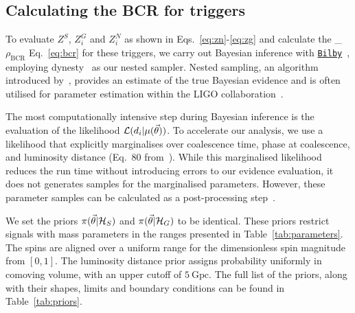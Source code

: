 \documentclass[%
 nofootinbib,
 amsmath,amssymb,
 aps,
 twocolumn
]{revtex4-2}
\newcommand{\bilby}{{\sc \href{https://lscsoft.docs.ligo.org/bilby/}{\texttt{Bilby}}}\xspace}
\newcommand{\dynesty}{{\sc dynesty}\xspace}
\newcommand{\mathcmd}[1]{{\sc \relax\ifmmode#1\else $#1$\fi}\xspace}
\newcommand{\bcr}{\mathcmd{\rho_\text{BCR}}}
\newcommand{\parameters}{\mathcmd{\vec{\theta}}}
\newcommand{\template}{\mathcmd{\mu(\parameters)}}
\begin{document}
\subsection{Calculating the BCR for triggers}
To evaluate $Z^S$, $Z^G_i$ and $Z^N_i$ as shown in Eqs.~\ref{eq:zn}-\ref{eq:zg} and calculate the \bcr Eq.~\ref{eq:bcr} for these triggers, we carry out Bayesian inference with \bilby~\cite{bilby}, employing \dynesty~\cite{dynesty} as our nested sampler. Nested sampling, an algorithm introduced by~\citet{skilling2004, skilling2006}, provides an estimate of the true Bayesian evidence and is often utilised for parameter estimation within the LIGO collaboration~\cite{bilby, bilby_paper, pbilby_paper}.

The most computationally intensive step during Bayesian inference is the evaluation of the likelihood $\mathcal{L}(d_i|\template)$. To accelerate our analysis, we use a likelihood that explicitly marginalises over coalescence time, phase at coalescence, and luminosity distance (Eq.~80 from~\citet{intro_to_gw_bayes}). While this marginalised likelihood reduces the run time without introducing errors to our evidence evaluation, it does not generates samples for the marginalised parameters. However, these parameter samples can be calculated as a post-processing step~\cite{intro_to_gw_bayes}.

We set the priors $\pi(\parameters|\mathcal{H}_S)$ and $\pi(\parameters|\mathcal{H}_G)$ to be identical. These priors restrict signals with mass parameters in the ranges presented in Table~\ref{tab:parameters}. The spins are aligned over a uniform range for the dimensionless spin magnitude from $\left[0,1\right]$. The luminosity distance prior assigns probability uniformly in comoving volume, with an upper cutoff of $5\ \text{Gpc}$. The full list of the priors, along with their shapes, limits and boundary conditions can be found in Table~\ref{tab:priors}. 
\end{document}
